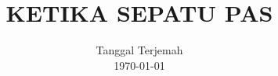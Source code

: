 


%



\pagestyle{empty}
\title{KETIKA SEPATU PAS}
\date{Tanggal Terjemah\\
      \today}
\maketitle


\pagestyle{mystyle}
\setcounter{page}{1}
\ifdefined\theHchapter\else\newcommand\theHchapter{\arabic{chapter}}\fi

